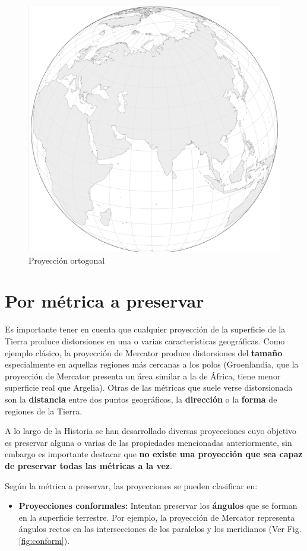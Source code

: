 \documentclass[
]{book}
\providecommand{\tightlist}{%
  \setlength{\itemsep}{0pt}\setlength{\parskip}{0pt}}
\theoremstyle{definition}
\theoremstyle{definition}
\theoremstyle{definition}
\theoremstyle{definition}
\theoremstyle{remark}
\begin{document}
\begin{figure}

{\centering \includegraphics[width=0.4\linewidth]{img/orto} 

}

\caption{Proyección ortogonal}\label{fig:orto}
\end{figure}

\hypertarget{por-muxe9trica-a-preservar}{%
\section{Por métrica a preservar}\label{por-muxe9trica-a-preservar}}

Es importante tener en cuenta que cualquier proyección de la superficie de la
Tierra produce distorsiones en una o varias características geográficas. Como
ejemplo clásico, la proyección de Mercator produce distorsiones del \textbf{tamaño}
especialmente en aquellas regiones más cercanas a los polos (Groenlandia, que la
proyección de Mercator presenta un área similar a la de África, tiene menor
superficie real que Argelia). Otras de las métricas que suele verse
distorsionada son la \textbf{distancia} entre dos puntos geográficos, la
\textbf{dirección} o la \textbf{forma} de regiones de la Tierra.

A lo largo de la Historia se han desarrollado diversas proyecciones cuyo
objetivo es preservar alguna o varias de las propiedades mencionadas
anteriormente, sin embargo es importante destacar que \textbf{no existe una proyección
que sea capaz de preservar todas las métricas a la vez}.

Según la métrica a preservar, las proyecciones se pueden clasificar en:

\begin{itemize}
\tightlist
\item
  \textbf{Proyecciones conformales:} Intentan preservar los \textbf{ángulos} que se
  forman en la superficie terrestre. Por ejemplo, la proyección de Mercator
  representa ángulos rectos en las intersecciones de los paralelos y los
  meridianos (Ver Fig. \ref{fig:conform}).
\end{itemize}
\end{document}
